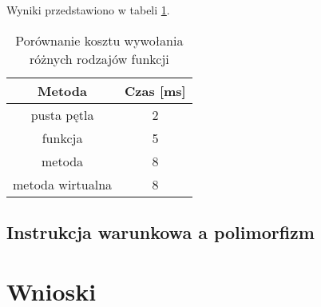 \documentclass{article}
\begin{document}
Wyniki przedstawiono w tabeli \ref{table:fun}.

\begin{table}[H]
\center
\begin{tabular}{ c c }
  \textbf{Metoda} & \textbf{Czas [ms]} \\ \hline
  pusta pętla & 2 \\ \hline
  funkcja & 5 \\ \hline
  metoda & 8 \\ \hline
  metoda wirtualna & 8 \\
\end{tabular}
\caption{Porównanie kosztu wywołania różnych rodzajów funkcji}
\label{table:fun}
\end{table}

\subsection{Instrukcja warunkowa a polimorfizm}


\section{Wnioski}
\end{document}
